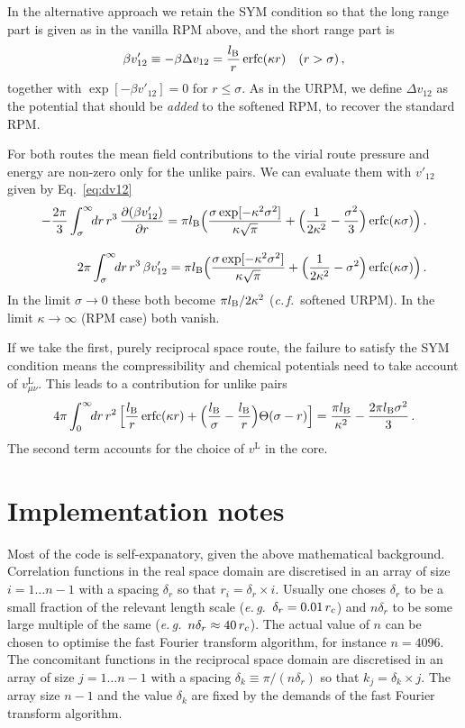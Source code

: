 \documentclass[12pt,a4paper]{article}
\DeclareMathOperator{\erfc}{erfc}
\newcommand{\latin}[1]{\emph{#1}}
\newcommand{\eg}{\latin{e.\,g.}}
\newcommand{\cf}{\latin{c.\,f.}}
\newcommand{\lr}{^{\mathrm{L}}}
\newcommand{\Eqref}[1]{Eq.~\eqref{#1}}
\begin{document}
In the alternative approach we retain the SYM condition so that the
long range part is given as in the vanilla RPM above, and the short range
part is
%
\begin{equation}
  \beta v'_{12}\equiv-\beta\Delta v_{12}=\frac{\lB}{r}\erfc(\kappa r)
  \quad(r>\sigma)\,,
\label{eq:dv12a}
\end{equation}
%
together with $\exp[-\beta v'_{12}]=0$ for $r\le\sigma$.
As in the URPM, we define $\Delta v_{12}$ as the potential that should
be \emph{added} to the softened RPM, to recover the standard RPM.

For both routes the mean field contributions to the virial route
pressure and energy are non-zero only for the unlike pairs.  We can
evaluate them with $v'_{12}$ given by \Eqref{eq:dv12}
%
\begin{eqnarray}
\displaystyle
-\frac{2\pi}{3}\int_\sigma^\infty\!\!dr\,r^3\,
\frac{\partial(\beta
  v'_{12})}{\partial r}=
\pi\lB\Bigl(\frac{\sigma\exp[-\kappa^2\sigma^2]}{\kappa\sqrt{\pi}}
+\Bigl(\frac{1}{2\kappa^2}-\frac{\sigma^2}{3}\Bigr) \erfc(\kappa
\sigma)\Bigr)\,.\\[9pt]
\displaystyle
2\pi \int_\sigma^\infty\!\!dr\,r^3\,\beta v'_{12}=
\pi\lB\Bigl(\frac{\sigma\exp[-\kappa^2\sigma^2]}{\kappa\sqrt{\pi}}
+\Bigl(\frac{1}{2\kappa^2}-\sigma^2\Bigr) \erfc(\kappa
\sigma)\Bigr)\,.
\end{eqnarray}
%
In the limit $\sigma\to0$ these both become $\pi l_{\mathrm{B}}/2\kappa^2$
(\cf\ softened URPM).  In the limit $\kappa\to\infty$ (RPM case) both
vanish.

If we take the first, purely reciprocal space route, the failure to
satisfy the SYM condition means the compressibility and chemical
potentials need to take account of $v_{\mu\nu}\lr$.  This leads to a
contribution for unlike pairs
%
\begin{equation}
  {4\pi}\int_0^\infty\!\!dr\,r^2\,
  \Bigl[\frac{\lB}{r}\erfc(\kappa r)
    +\Bigl(\frac{\lB}{\sigma}
    -\frac{\lB}{r}\Bigr)\Theta(\sigma-r)\Bigr]
  =\frac{\pi\lB}{\kappa^2}-\frac{2\pi\lB\sigma^2}{3}\,.
\end{equation}
%
The second term accounts for the choice of $v\lr$ in the core.

\section{Implementation notes}
%
Most of the code is self-expanatory, given the above mathematical
background.  Correlation functions in the real space domain are
discretised in an array of size $i = 1 \dots n-1$ with a spacing
$\delta_r$ so that $r_i = \delta_r \times i$.  Usually one choses
$\delta_r$ to be a small fraction of the relevant length scale
(\eg\ $\delta_r = 0.01\,r_c$) and $n\delta_r$ to be some large multiple
of the same (\eg\ $n\delta_r\approx 40\,r_c$).  The actual value of $n$
can be chosen to optimise the fast Fourier transform algorithm, for
instance $n=4096$.  The concomitant functions in the reciprocal space
domain are discretised in an array of size $j=1\dots n-1$ with a
spacing $\delta_k \equiv \pi / (n\delta_r)$ so that $k_j = \delta_k
\times j$.  The array size $n-1$ and the value $\delta_k$ are fixed by
the demands of the fast Fourier transform algorithm.
\end{document}
